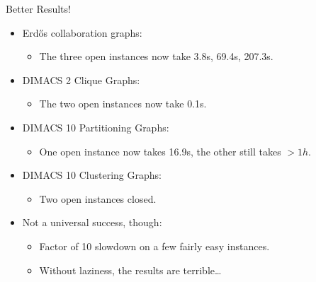 \documentclass{beamer}
\begin{document}
\begin{frame}{Better Results!}
    \begin{itemize}
        \item Erd\H{o}s collaboration graphs:
            \begin{itemize}
                \item The three open instances now take 3.8s, 69.4s, 207.3s.
            \end{itemize}

        \item DIMACS 2 Clique Graphs:
            \begin{itemize}
                \item The two open instances now take 0.1s.
            \end{itemize}

        \item DIMACS 10 Partitioning Graphs:
            \begin{itemize}
                \item One open instance now takes 16.9s, the other still takes $>1h$.
            \end{itemize}

        \item DIMACS 10 Clustering Graphs:
            \begin{itemize}
                \item Two open instances closed.
            \end{itemize}

        \item Not a universal success, though:
            \begin{itemize}
                \item Factor of 10 slowdown on a few fairly easy instances.
                \item Without laziness, the results are terrible\ldots
            \end{itemize}
    \end{itemize}
\end{frame}
\end{document}
